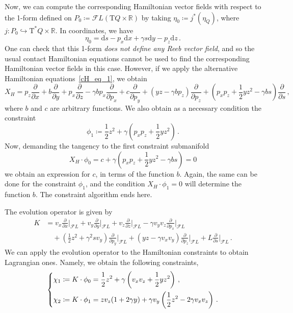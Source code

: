 \documentclass[11pt]{article}
\theoremstyle{plain}
\theoremstyle{definition}
\newcommand{\R}{\mathbb{R}}
\renewcommand{\d}{\mathrm{d}}
\newcommand{\T}{{\mathrm T}}
\let\Tan\T
\newcommand{\parder}[2]{\frac{\partial #1}{\partial #2}}
\def\d{\mathrm{d}}
\def\d{\mathrm{d}}
\def\Tan{\mathrm{T}}
\def\FL{\mathcal{F} L}
\begin{document}
Now, we can compute the corresponding Hamiltonian vector fields with respect to the 1-form defined on $P_0\coloneq\FL(\Tan Q \times \R)$ by taking $\eta_0 \coloneqq j^*(\eta_Q)$, where $j\colon P_0\hookrightarrow \Tan^*Q \times \R$. In coordinates, we have
$$
\eta_0 = \d s - p_x \d x + \gamma s\d y - p_z\d z \,.
$$
One can check that this 1-form \textit{does not define any Reeb vector field}, and so the usual contact Hamiltonian equations cannot be used to find the corresponding Hamiltonian vector fields in this case.
However, if we apply the alternative Hamiltonian equations~\eqref{cH_eq_1}, we obtain
$$
X_H =  
p_z \parder{}{x} +b\parder{}{y}+ p_x \parder{}{z} -\gamma b p_x \parder{}{p_x}
+ c \parder{}{p_y} + (yz- \gamma b p_z) \parder{}{p_z} 
+ \left(p_xp_z + \frac12 yz^2 -\gamma b s \right) \parder{}{s}
\,,
$$
where $b$ and $c$ are arbitrary functions. We also obtain as a necessary condition the constraint 
$$ \phi_1 \coloneqq \frac12 z ^2 + \gamma\left(p_x p_z +\frac{1}{2}yz^2\right)\,. $$
Now, demanding the tangency to the first constraint submanifold
$$X_H\cdot \phi_0 = c +\gamma\left(p_xp_z +\frac12 yz^2-\gamma bs \right)  = 0$$
we obtain an expression for $c$, in terms of the function $b$.
Again, the same can be done for the constraint $\phi_1$, and the condition $X_H \cdot \phi_1=0$ will determine the function $b$. The constraint algorithm ends here.

The evolution operator is given by
\begin{align}
    K &= 
v_x\parder{}{x}\Big|_{\FL}  + v_y\parder{}{y}\Big|_{\FL}  + v_z\parder{}{z}\Big|_{\FL} 
-\gamma v_yv_z\parder{}{p_x}\Big|_{\FL} \\
&\quad+ \left( \frac{1}{2}z^2 + \gamma^2 s v_y \right) \parder{}{p_y}\Big|_{\FL} 
+ (yz -\gamma v_xv_y)\parder{}{p_z} \Big|_{\FL} 
+ L\parder{}{s}\Big|_{\FL} 
\,. 
\end{align}
We can apply the evolution operator to the Hamiltonian constraints to obtain Lagrangian ones. Namely, we obtain the following constraints,
\begin{equation}
    \begin{dcases}
        \chi_1 \coloneqq K\cdot \phi_0 = \frac{1}{2}z^2 + \gamma \left(v_x v_z +\frac{1}{2}yz^2 \right)\,,
        \\
        \chi_2 \coloneqq K\cdot \phi_1 = zv_z(1+2 \gamma y) + \gamma v_y \left( \frac{1}{2}z^2   -2\gamma v_x v_z \right)\,.
    \end{dcases}
\end{equation}
\end{document}

